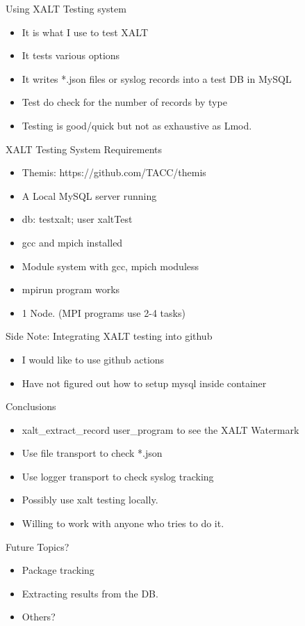 \documentclass{beamer}
\begin{document}
\begin{frame}{Using XALT Testing system}
  \begin{itemize}
    \item It is what I use to test XALT
    \item It tests various options
    \item It writes *.json files or syslog records into a test DB in MySQL
    \item Test do check for the number of records by type
    \item Testing is good/quick but not as exhaustive as Lmod.
  \end{itemize}
\end{frame}

\begin{frame}{XALT Testing System Requirements}
  \begin{itemize}
    \item Themis: https://github.com/TACC/themis
    \item A Local MySQL server running
    \item db: testxalt; user xaltTest
    \item gcc and mpich installed
    \item Module system with gcc, mpich moduless 
    \item mpirun program works
    \item 1 Node. (MPI programs use 2-4 tasks)
  \end{itemize}
\end{frame}

\begin{frame}{Side Note: Integrating XALT testing into github}
  \begin{itemize}
    \item I would like to use github actions
    \item Have not figured out how to setup mysql inside container
  \end{itemize}
\end{frame}


\begin{frame}{Conclusions}
  \begin{itemize}
    \item xalt\_extract\_record user\_program to see the XALT
      Watermark
    \item Use file transport to check *.json
    \item Use logger transport to check syslog tracking
    \item Possibly use xalt testing locally.
    \item Willing to work with anyone who tries to do it.
  \end{itemize}
\end{frame}


\begin{frame}{Future Topics?} 
  \begin{itemize}
    \item Package tracking
    \item Extracting results from the DB.
    \item Others?
  \end{itemize}
\end{frame}
%

%
\end{document}
